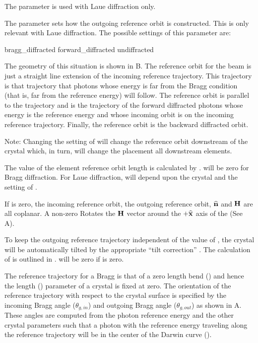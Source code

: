 The  parameter is used with Laue diffraction only.

The  parameter sets how the outgoing reference
orbit is constructed. This is only relevant with Laue diffraction.
The possible settings of this parameter are:
\begin{example}
  bragg_diffracted
  forward_diffracted
  undiffracted
\end{example}
The geometry of this situation is shown in B. The
reference orbit for the  beam is just a straight line
extension of the incoming reference trajectory. This trajectory is
that trajectory that photons whose energy is far from the Bragg
condition (that is, far from the reference energy) will follow. The
 reference orbit is parallel to the
 trajectory and is the trajectory of the forward
diffracted photons whose energy is the reference energy and whose
incoming orbit is on the incoming reference trajectory. Finally, the
 reference orbit is the backward diffracted orbit.

Note: Changing the setting of  will change the
reference orbit downstream of the crystal which, in turn, will change
the placement all downstream elements.

The value of the element reference orbit length  is calculated
by \bmad.  will be zero for Bragg diffraction. For Laue
diffraction,  will depend upon the crystal  and
the setting of .

If  is zero, the incoming reference orbit, the outgoing
reference orbit, ${\widehat{\bf n}}$ and ${\bf H}$ are all coplanar. A non-zero
 Rotates the ${\bf H}$ vector around the $+{\widehat{\bf x}}$ axis
of the  (See A).

To keep the outgoing reference trajectory independent of the value of
, the crystal will be automatically tilted by the
appropriate ``tilt correction'' . The calculation of
 is outlined in . 
will be zero if  is zero.

The reference trajectory for a Bragg  is that of a zero
length bend () and hence the length ()
parameter of a crystal is fixed at zero. The orientation of the
reference trajectory with respect to the crystal surface is specified
by the incoming Bragg angle  ($\theta_{g,in}$) and
outgoing Bragg angle  ($\theta_{g,out}$) as shown
in A. These angles are computed from the photon
reference energy and the other crystal parameters such that a photon
with the reference energy traveling along the reference trajectory
will be in the center of the Darwin curve ().


